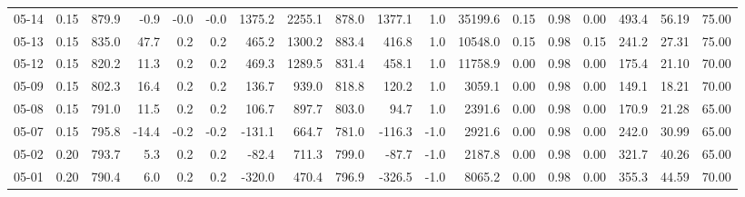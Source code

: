 \begin{threeparttable}
{\begin{tabular}{lrrrrrrrrrrrrrrrrr}
  05-14 &     0.15 & 879.9 &              -0.9 &              -0.0 &               -0.0 &             1375.2 & 2255.1 & 878.0 &     1377.1 &                      1.0 &             35199.6 &       0.15 &      0.98 &           0.00 &            493.4 &           56.19 &                  75.00 \\
  05-13 &     0.15 & 835.0 &              47.7 &               0.2 &                0.2 &              465.2 & 1300.2 & 883.4 &      416.8 &                      1.0 &             10548.0 &       0.15 &      0.98 &           0.15 &            241.2 &           27.31 &                  75.00 \\
  05-12 &     0.15 & 820.2 &              11.3 &               0.2 &                0.2 &              469.3 & 1289.5 & 831.4 &      458.1 &                      1.0 &             11758.9 &       0.00 &      0.98 &           0.00 &            175.4 &           21.10 &                  70.00 \\
  05-09 &     0.15 & 802.3 &              16.4 &               0.2 &                0.2 &              136.7 &  939.0 & 818.8 &      120.2 &                      1.0 &              3059.1 &       0.00 &      0.98 &           0.00 &            149.1 &           18.21 &                  70.00 \\
  05-08 &     0.15 & 791.0 &              11.5 &               0.2 &                0.2 &              106.7 &  897.7 & 803.0 &       94.7 &                      1.0 &              2391.6 &       0.00 &      0.98 &           0.00 &            170.9 &           21.28 &                  65.00 \\
  05-07 &     0.15 & 795.8 &             -14.4 &              -0.2 &               -0.2 &             -131.1 &  664.7 & 781.0 &     -116.3 &                     -1.0 &              2921.6 &       0.00 &      0.98 &           0.00 &            242.0 &           30.99 &                  65.00 \\
  05-02 &     0.20 & 793.7 &               5.3 &               0.2 &                0.2 &              -82.4 &  711.3 & 799.0 &      -87.7 &                     -1.0 &              2187.8 &       0.00 &      0.98 &           0.00 &            321.7 &           40.26 &                  65.00 \\
  05-01 &     0.20 & 790.4 &               6.0 &               0.2 &                0.2 &             -320.0 &  470.4 & 796.9 &     -326.5 &                     -1.0 &              8065.2 &       0.00 &      0.98 &           0.00 &            355.3 &           44.59 &                  70.00 \\

\end{tabular}}
\end{threeparttable}

